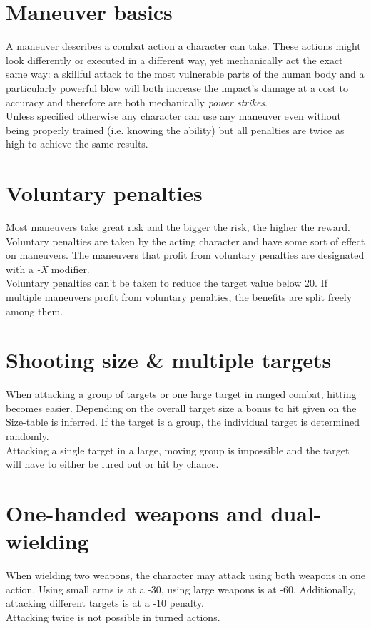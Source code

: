 \section{Maneuver basics}
A maneuver describes a combat action a character can take. These actions might look differently or executed in a different way, yet mechanically act the exact same way: a skillful attack to the most vulnerable parts of the human body and a particularly powerful blow will both increase the impact’s damage at a cost to accuracy and therefore are both mechanically \textit{power strikes}.\\
Unless specified otherwise any character can use any maneuver even without being properly trained (i.e. knowing the ability) but all penalties are twice as high to achieve the same results.
\section{Voluntary penalties}
Most maneuvers take great risk and the bigger the risk, the higher the reward. Voluntary penalties are taken by the acting character and have some sort of effect on maneuvers. The maneuvers that profit from voluntary penalties are designated with a \emph{-X} modifier.\\
Voluntary penalties can’t be taken to reduce the target value below 20. If multiple maneuvers profit from voluntary penalties, the benefits are split freely among them.
\section{Shooting size \& multiple targets}
When attacking a group of targets or one large target in ranged combat, hitting becomes easier. Depending on the overall target size a bonus to hit given on the Size-table is inferred. If the target is a group, the individual target is determined randomly.\\
Attacking a single target in a large, moving group is impossible and the target will have to either be lured out or hit by chance.
\section{One-handed weapons and dual-wielding}
When wielding two weapons, the character may attack using both weapons in one action. Using small arms is at a -30, using large weapons is at -60. Additionally, attacking different targets is at a -10 penalty.\\
Attacking twice is not possible in turned actions.
